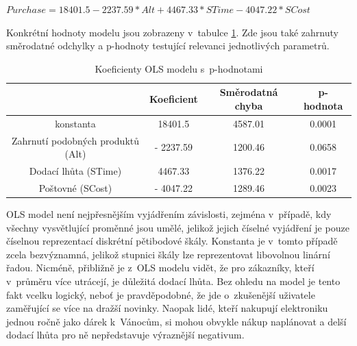 \documentclass[12pt,twoside,openany]{fithesis}
\begin{document}
\begin{center}
$ Purchase = 18401.5 - 2237.59*Alt + 4467.33*STime - 4047.22*SCost $
\end{center}

Konkrétní hodnoty modelu jsou zobrazeny v~tabulce 
\hyperlink{tab-ols}{\ref{tab-ols}}.
Zde jsou také zahrnuty směrodatné odchylky a p-hodnoty testující relevanci jednotlivých parametrů.

            \begin{table}[htb]
                \begin{center}%
                    \begin{tabular}{|c|c|c|c|}
                        \hline 
                        {{}} & {{Koeficient}} & {{Směrodatná chyba}} & {{p-hodnota}} \tabularnewline
                         \hline 
                         {{konstanta}} & {{18401.5}} & {{4587.01}} & {{0.0001}} \tabularnewline
                          \hline 
                          {{Zahrnutí podobných produktů (Alt)}} & {{- 2237.59}} & {{1200.46}} & {{0.0658}} \tabularnewline
                           \hline 
                           {{Dodací lhůta (STime)}} & {{4467.33}} & {{1376.22}} & {{0.0017}} \tabularnewline
                            \hline 
                            {{Poštovné (SCost)}} & {{- 4047.22}} & {{1289.46}} & {{0.0023}} \tabularnewline
                            \hline 
                        \end{tabular}
                        \caption{Koeficienty OLS modelu s~p-hodnotami}\label{tab-ols}
                    \end{center}
                \end{table}

                OLS model není nejpřesnějším vyjádřením závislosti, 
zejména v~případě, kdy všechny vysvětlující proměnné jsou umělé, 
jelikož jejich číselné vyjádření je pouze číselnou reprezentací 
diskrétní pětibodové škály. Konstanta je v~tomto případě zcela 
bezvýznamná, jelikož stupnici škály lze reprezentovat libovolnou linární 
řadou. Nicméně, přibližně je z~OLS modelu vidět, že pro zákazníky, 
kteří v~průměru více utrácejí, je důležitá dodací lhůta. Bez ohledu 
na model je tento fakt vcelku logický, neboť je pravděpodobné, že jde 
o~zkušenější uživatele zaměřující se více na dražší novinky. 
Naopak lidé, kteří nakupují elektroniku jednou ročně jako dárek 
k~Vánocům, si mohou obvykle nákup naplánovat a delší dodací lhůta pro 
ně nepředstavuje výraznější negativum.
\end{document}
